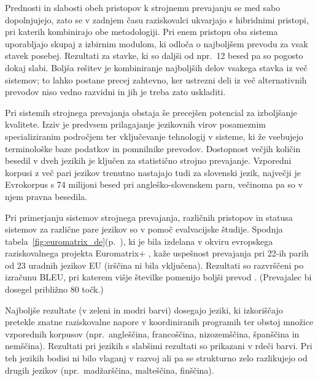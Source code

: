 \begin{multicols}{2}
Prednosti in slabosti obeh pristopov k stroj\-nemu prevajanju se med sabo dopolnjujejo, zato se v zadnjem času raziskovalci ukvarjajo s hibridnimi pristopi, pri katerih kombinirajo obe metodologiji. Pri enem pristopu oba sistema uporab\-ljajo skupaj z izbirnim modulom, ki odloča o naj\-boljšem prevodu za vsak stavek posebej. Rezultati za stavke, ki so daljši od npr.~12 besed pa so pogosto dokaj slabi. Boljša rešitev je kombiniranje naj\-boljših delov vsakega stavka iz več sistemov; to lahko postane precej zah\-tevno, ker ustrezni deli iz več alternativnih prevodov niso vedno razvidni in jih je treba zato uskladiti.

Pri sistemih stroj\-nega prevajanja obstaja še precejšen potencial za izboljšanje kvalitete. Izziv je predvsem prilagajanje jezikovnih virov posameznim specializiranim področjem ter vključevanje tehnologij v sisteme, ki že vsebujejo terminološke baze podatkov in pomnilnike prevodov. Dostopnost večjih količin besedil v dveh jezikih je ključen za statistično stroj\-no prevajanje. Vzporedni korpusi z več pari jezikov trenutno nastajajo tudi za slovenski jezik, naj\-večji je Evrokorpus s 74 mili\-joni besed pri angleško-slovenskem paru, večinoma pa so v njem pravna besedila.

Pri primerjanju sistemov stroj\-nega prevajanja, različnih pristopov in statusa sistemov za različne pare jezikov so v pomoč evalvacij\-ske študije. Spodnja tabela~\ref{fig:euromatrix_de}(p.~\pageref{fig:euromatrix_de}), ki je bila izdelana v okviru evropskega raziskovalnega projekta Euromatrix+ \cite{euro1}, kaže uspešnost prevajanja pri 22-ih parih od 23 uradnih jezikov EU (irščina ni bila vključena). Rezultati so razvrščeni po izračunu BLEU, pri katerem višje številke po\-menijo boljši prevod \cite{bleu1}.  (Prevajalec bi dosegel približno 80 točk.) 


Naj\-boljše rezultate (v zeleni in modri barvi) dosegajo jeziki, ki izkoriščajo pretekle znatne raziskovalne napore v koordiniranih programih ter obstoj množice vzporednih korpusov (npr.~angleščina, francoščina, nizozemščina, španščina in nemščina). Rezultati pri jezikih s slabšimi rezultati so prikazani v rdeči barvi. Pri teh jezikih bodisi ni bilo vlaganj v razvoj ali pa se strukturno zelo razlikujejo od drugih jezikov (npr.~madžarščina, malteščina, finščina).


\end{multicols}
